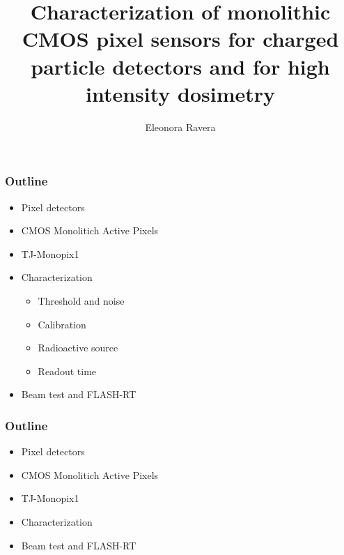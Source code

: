 \documentclass{beamer}
\title[]{Characterization of monolithic CMOS pixel sensors for charged particle detectors and for high intensity dosimetry}
\institute{Università degli studi di Pisa}
\author[Eleonora Ravera]{Eleonora Ravera}
\begin{document}
	 
\begin{frame}
\setTitlestyleDissertation
\maketitle
\end{frame}

\usetikzlibrary{decorations.pathreplacing}        


\begin{frame}[noframenumbering]
    \frametitle{Outline}
    \begin{itemize}
        \item Pixel detectors 
        \item CMOS Monolitich Active Pixels 
        \item TJ-Monopix1
        \item Characterization 
        \begin{itemize}
            \item Threshold and noise
            \item Calibration 
            \item Radioactive source
            \item Readout time
        \end{itemize}
        \item Beam test and FLASH-RT
    \end{itemize}
\end{frame}

\begin{frame}[noframenumbering]
    \frametitle{Outline}
    \begin{itemize}
        \item <alert@1> Pixel detectors 
        \item CMOS Monolitich Active Pixels 
        \item TJ-Monopix1
        \item Characterization 
        \item Beam test and FLASH-RT
    \end{itemize}
\end{frame}


\end{document}
